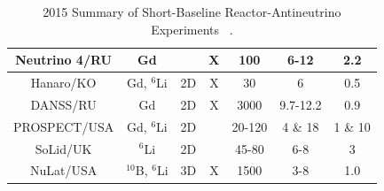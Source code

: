 \begin{table}[ht]
\begin{tabular}{|c|c|c|c|c|c|c|}
Neutrino 4/RU & Gd                 &                                                          & X                                                          & 100                                                            & 6-12                                            & 2.2                                                           \\ \hline
Hanaro/KO     & Gd, $^{6}$Li       & 2D                                                       & X                                                          & 30                                                             & 6                                               & 0.5                                                           \\ \hline
DANSS/RU      & Gd                 & 2D                                                       & X                                                          & 3000                                                           & 9.7-12.2                                        & 0.9                                                           \\ \hline
PROSPECT/USA  & Gd, $^{6}$Li       & 2D                                                       &                                                            & 20-120                                                         & 4 \& 18                                         & 1 \& 10                                                       \\ \hline
SoLid/UK      & $^{6}$Li           & 2D                                                       &                                                            & 45-80                                                          & 6-8                                             & 3                                                             \\ \hline
NuLat/USA     & $^{10}$B, $^{6}$Li & 3D                                                       & X                                                          & 1500                                                           & 3-8                                             & 1.0                                                           \\ \hline
\end{tabular}



  
  \caption[2015 Summary of Short-Baseline Reactor-Antineutrino Experiments]{2015 Summary of Short-Baseline Reactor-Antineutrino Experiments ~\cite{Lane:2015alq}.\\ 
  }
  \label{tab:sbre}
\end{table}

